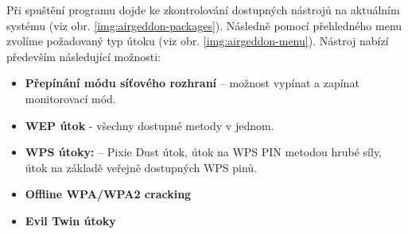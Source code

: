 Při spuštění programu dojde ke zkontrolování dostupných nástrojů na aktuálním systému (viz obr. \ref{img:airgeddon-packages}). Následně pomocí přehledného menu zvolíme požadovaný typ útoku (viz obr. \ref{img:airgeddon-menu}). Nástroj nabízí především následující možnosti:
\begin{itemize}
  \item{\textbf{Přepínání módu síťového rozhraní} -- možnost vypínat a zapínat monitorovací mód.}
  \item{\textbf{WEP útok} - všechny dostupné metody v jednom.}
  \item{\textbf{WPS útoky:} -- Pixie Dust útok, útok na WPS PIN metodou hrubé síly, útok na základě veřejně dostupných WPS pinů.}
  \item{\textbf{Offline WPA/WPA2 cracking}}
  \item{\textbf{Evil Twin útoky}}
\end{itemize}

